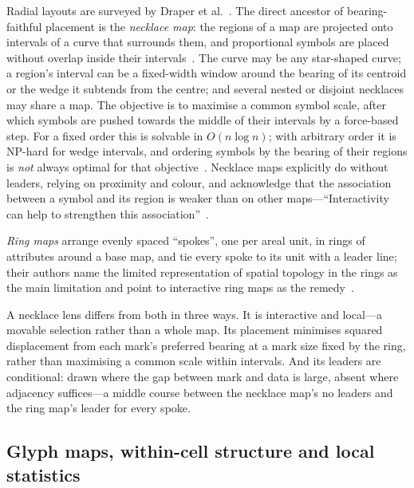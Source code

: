 Radial layouts are surveyed by Draper et al.~\cite{draper2009radial}. The
direct ancestor of bearing-faithful placement is the \emph{necklace map}: the
regions of a map are projected onto intervals of a curve that surrounds them,
and proportional symbols are placed without overlap inside their
intervals~\cite{speckmann2010necklace}. The curve may be any star-shaped curve;
a region's interval can be a fixed-width window around the bearing of its
centroid or the wedge it subtends from the centre; and several nested or
disjoint necklaces may share a map. The objective is to maximise a common symbol
scale, after which symbols are pushed towards the middle of their intervals by a
force-based step. For a fixed order this is solvable in $O(n\log n)$; with
arbitrary order it is NP-hard for wedge intervals, and ordering symbols by the
bearing of their regions is \emph{not} always optimal for that
objective~\cite{speckmann2015algorithms}. Necklace maps explicitly do without
leaders, relying on proximity and colour, and acknowledge that the association
between a symbol and its region is weaker than on other maps---``Interactivity
can help to strengthen this association''~\cite{speckmann2010necklace}.

\emph{Ring maps} arrange evenly spaced ``spokes'', one per areal unit, in rings
of attributes around a base map, and tie every spoke to its unit with a leader
line; their authors name the limited representation of spatial topology in the
rings as the main limitation and point to interactive ring maps as the
remedy~\cite{stewart2011ringmaps}.

A necklace lens differs from both in three ways. It is interactive and local---a
movable selection rather than a whole map. Its placement minimises squared
displacement from each mark's preferred bearing at a mark size fixed by the ring,
rather than maximising a common scale within intervals. And its leaders are
conditional: drawn where the gap between mark and data is large, absent where
adjacency suffices---a middle course between the necklace map's no leaders and
the ring map's leader for every spoke.

\subsection{Glyph maps, within-cell structure and local statistics}

